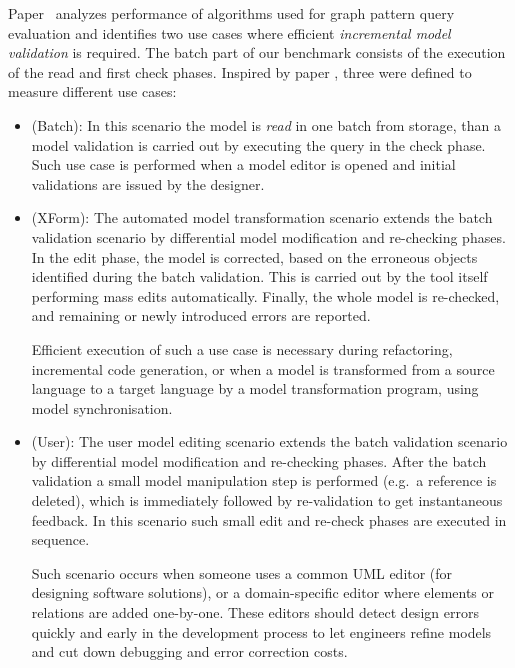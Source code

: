 Paper~\cite{icgt08-bhrv} analyzes performance of algorithms used for graph
pattern query evaluation and identifies two use cases where efficient
\emph{incremental model validation} is required. The batch part of our benchmark
consists of the execution of the read and first check phases. Inspired by paper
\cite{icgt08-bhrv}, three  were defined to measure different
use cases:
\begin{itemize}
  
  \item {} (\textsf{Batch}):
  In this scenario the model is \emph{read} in one batch from storage, than a model validation is carried out by executing the query in the check phase. Such use case is performed when a model editor is opened and initial validations are issued by the designer. 
  
  \item {} (\textsf{XForm}):
  The automated model transformation scenario extends the batch validation scenario by differential model modification and re-checking phases. In the edit phase, the model is corrected, based on the erroneous objects identified during the batch validation. This is carried out by the tool itself performing mass edits automatically. Finally, the whole model is re-checked, and remaining or newly introduced errors are reported. 
  
  Efficient execution of such a use case is necessary during refactoring, incremental code generation, or when a model is transformed from a source language to a target language by a model transformation program, using model synchronisation.
  
  \item {} (\textsf{User}):
  The user model editing scenario extends the batch validation scenario by differential model modification and re-checking phases. After the batch validation a small model manipulation step is performed (e.g.\ a reference is deleted), which is immediately followed by re-validation to get instantaneous feedback.  In this scenario such small edit and re-check phases are executed in sequence.
  
  Such scenario occurs when someone uses a common UML editor (for designing software solutions), or a domain-specific editor where elements or relations are added one-by-one. These editors should detect design errors quickly and early in the development process to let engineers refine models and cut down debugging and error correction costs.
  
\end{itemize}


